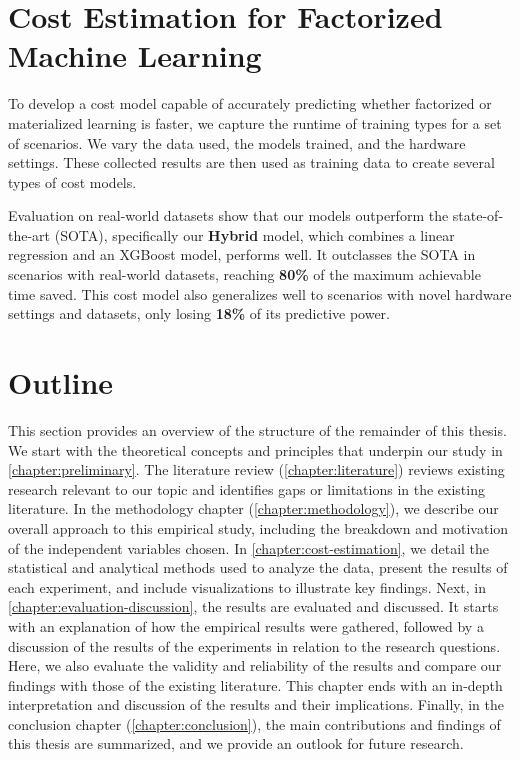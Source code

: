 \section{Cost Estimation for Factorized Machine Learning}
To develop a cost model capable of accurately predicting whether factorized or materialized learning is faster, we capture the runtime of training types for a set of scenarios. We vary the data used, the models trained, and the hardware settings. These collected results are then used as training data to create several types of cost models.

Evaluation on real-world datasets show that our models outperform the state-of-the-art (SOTA), specifically our \textbf{Hybrid} model, which combines a linear regression and an XGBoost model, performs well. It outclasses the SOTA in scenarios with real-world datasets, reaching \textbf{80\%} of the maximum achievable time saved. This cost model also generalizes well to scenarios with novel hardware settings and datasets, only losing \textbf{18\%} of its predictive power.

\section{Outline}
This section provides an overview of the structure of the remainder of this thesis. We start with the theoretical concepts and principles that underpin our study in \autoref{chapter:preliminary}. The literature review (\autoref{chapter:literature}) reviews existing research relevant to our topic and identifies gaps or limitations in the existing literature. In the methodology chapter (\autoref{chapter:methodology}), we describe our overall approach to this empirical study, including the breakdown and motivation of the independent variables chosen.  In \autoref{chapter:cost-estimation}, we detail the statistical and analytical methods used to analyze the data, present the results of each experiment, and include visualizations to illustrate key findings. Next, in \autoref{chapter:evaluation-discussion}, the results are evaluated and discussed. It starts with an explanation of how the empirical results were gathered, followed by a discussion of the results of the experiments in relation to the research questions. Here, we also evaluate the validity and reliability of the results and compare our findings with those of the existing literature. This chapter ends with an in-depth interpretation and discussion of the results and their implications.  Finally, in the conclusion chapter (\autoref{chapter:conclusion}), the main contributions and findings of this thesis are summarized, and we provide an outlook for future research.

